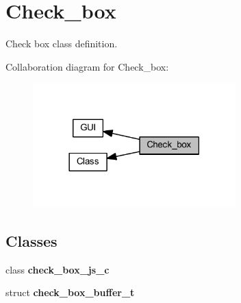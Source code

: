 \section{Check\+\_\+box}
\label{group___check__box}


Check box class definition.  


Collaboration diagram for Check\+\_\+box\+:
\nopagebreak
\begin{figure}[H]
\begin{center}
\leavevmode
\includegraphics[width=222pt]{group___check__box}
\end{center}
\end{figure}
\subsection*{Classes}
\begin{DoxyCompactItemize}
\item 
class \textbf{ check\+\_\+box\+\_\+js\+\_\+c}
\item 
struct \textbf{ check\+\_\+box\+\_\+buffer\+\_\+t}
\end{DoxyCompactItemize}
